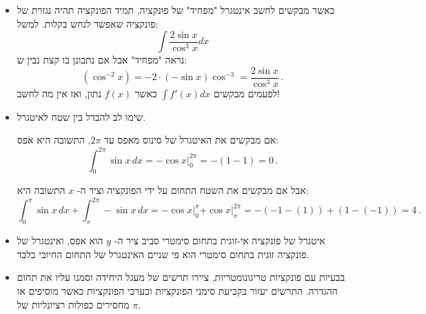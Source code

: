 \begin{itemize}
\item
כאשר מבקשים לחשב אינטגרל "מפחיד" של פונקציה, תמיד הפונקציה תהיה נגזרת של פונקציה שאפשר לנחש בקלות. למשל:
\[
\int\frac{2\sin x}{\cos^3 x}dx
\]
נראה "מפחיד" אבל אם נתבונן בו קצת נבין ש:
\[
(\cos^{-2} x)=-2\cdot (-\sin x) \cos^{-3}=\frac{2\sin x}{\cos^3 x}\,.
\]
לפעמים מבקשים
$\displaystyle\int f'(x) dx$
כאשר 
$f(x)$
נתון, ואז אין מה לחשב!

\np

\item 
שימו לב להבדל בין שטח לאיטגרל.

\begin{center}
\end{center}

אם מבקשים את האיטגרל של סינוס מאפס עד 
$2\pi$,
התשובה היא אפס:
\[
\int_0^{2\pi} \sin x\, dx =-\left.\cos x\right|_0^{2\pi}= -(1-1)=0\,.
\]

\vspace{-4ex}

אבל אם מבקשים את השטח התחום על ידי הפונקציה וציר ה-%
$x$
התשובה היא:
\[
\int_0^{\pi} \sin x\, dx + \int_{\pi}^{2\pi} -\sin x\, dx = -\left.\cos x\right|_0^{\pi} \left.+\cos x\right|_{\pi}^{2\pi}= -(-1-(1))+(1-(-1))=4\,.
\]

\vspace{-4ex}


\item
איטגרל של פונקציה אי-זוגית בתחום סימטרי סביב ציר ה-%
$y$
הוא אפס, ואינטגרל של פונקציה זוגית בתחום סימטרי הוא פי שניים האינטגרל של התחום החיובי בלבד.


\item
בבעיות עם פונקציות טריגונומטריות, ציירו תרשים של מעגל היחידה וסמנו עליו את תחום ההגדרה. התרשים יעזור בקביעת סימני הפונקציות ובערכי הפונקציות כאשר מוסיפים או מחסירים כפולות רציונליות של 
$\pi$.


\end{itemize}
